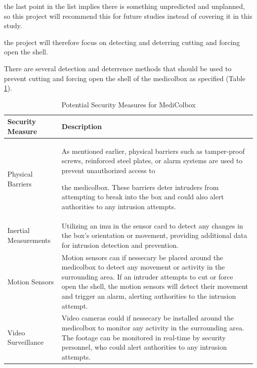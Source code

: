 \documentclass[../main.tex]{subfiles}
\begin{document}
the last point in the list implies there is something
unpredicted and unplanned, so this project will
recommend this for future studies
instead of covering it in this study.

the project will therefore focus on detecting
and deterring cutting and forcing open the shell.

There are several detection and deterrence methods
that should be used to prevent cutting and forcing open the shell of
the \gls{medicolbox} as specified (Table \ref{tab:PotentialSecurityMeasuresForMediColbox}).

\begin{table}[htbp]
    \centering
    \caption{Potential Security Measures for MediColbox}
    \label{tab:PotentialSecurityMeasuresForMediColbox}
    \begin{tabular}{|l|p{10cm}|} \hline
        \textbf{Security Measure} & \textbf{Description} \\ \hline
        
        Physical Barriers &
        As mentioned earlier,
        physical barriers such as tamper-proof screws,
        reinforced steel plates,
        or alarm systems are used to prevent unauthorized access to
        
        the \gls{medicolbox}.
        These barriers deter intruders from attempting to
        break into the box and could also alert authorities to
        any intrusion attempts. \\ \hline
        
        Inertial Measurements &
        Utilizing an \gls{imu} in the
        sensor card to detect any changes in the box's orientation or
        movement, providing additional data for
        intrusion detection and prevention. \\ \hline
        
        Motion Sensors &
        Motion sensors can if nessecary be placed around the
        \gls{medicolbox} to detect any movement or
        activity in the surrounding area.
        If an intruder attempts to cut or force open the shell,
        the motion sensors will detect their movement and
        trigger an alarm,
        alerting authorities to the intrusion attempt. \\ \hline
        
        Video Surveillance &
        Video cameras could if nessecary be installed around the \gls{medicolbox} to monitor any activity in the surrounding area. The footage can be monitored in real-time by security personnel, who could alert authorities to any intrusion attempts. \\ \hline


\end{tabular}
\end{table}
\end{document}
